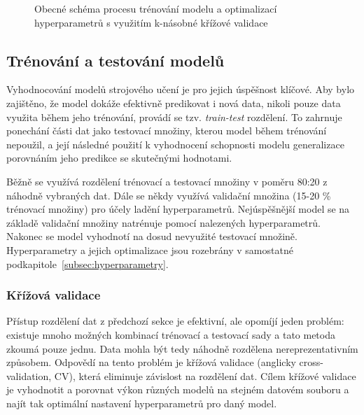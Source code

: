 \begin{figure}[!htb]
\begin{center}
        \caption{Obecné schéma procesu trénování modelu a optimalizací
            hyperparametrů s využitím k-násobné křížové
            validace~\cite{crossvalidation}}
        \label{fig:cross-validation}
    \end{center}
\end{figure}


\subsection{Trénování a testování modelů}
Vyhodnocování modelů strojového učení je pro jejich úspěšnost klíčové. Aby bylo
zajištěno, že model dokáže efektivně predikovat i nová data, nikoli pouze data
využita během jeho trénování, provádí se tzv. \emph{train-test} rozdělení. To
zahrnuje ponechání části dat jako testovací množiny, kterou model během
trénování nepoužil, a její následné použití k vyhodnocení schopnosti modelu
generalizace porovnáním jeho predikce se skutečnými hodnotami.

Běžně se využívá rozdělení trénovací a testovací množiny v poměru 80:20 z
náhodně vybraných dat. Dále se někdy využívá validační množina (15-20 \%
trénovací množiny) pro účely ladění hyperparametrů. Nejúspěšnější model se na
základě validační množiny natrénuje pomocí nalezených hyperparametrů. Nakonec se
model vyhodnotí na dosud nevyužité testovací množině. Hyperparametry a jejich
optimalizace jsou rozebrány v samostatné
podkapitole~\ref{subsec:hyperparametry}.

\subsubsection{Křížová validace} %
Přístup rozdělení dat z předchozí sekce je efektivní, ale opomíjí jeden problém:
existuje mnoho možných kombinací trénovací a testovací sady a tato metoda zkoumá
pouze jednu. Data mohla být tedy náhodně rozdělena nereprezentativním způsobem.
Odpovědí na tento problém je křížová validace (anglicky cross-validation,
\gls{CV}), která eliminuje závislost na rozdělení dat. Cílem křížové validace je
vyhodnotit a porovnat výkon různých modelů na stejném datovém souboru a najít
tak optimální nastavení hyperparametrů pro daný model.

